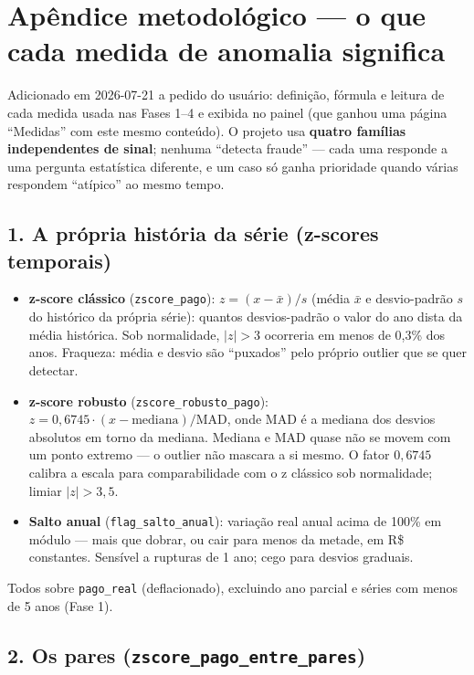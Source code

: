 \documentclass[11pt,a4paper]{article}
\begin{document}
\section{Apêndice metodológico --- o que cada medida de anomalia significa}

Adicionado em 2026-07-21 a pedido do usuário: definição, fórmula e leitura
de cada medida usada nas Fases 1--4 e exibida no painel (que ganhou uma
página ``Medidas'' com este mesmo conteúdo). O projeto usa \textbf{quatro
famílias independentes de sinal}; nenhuma ``detecta fraude'' --- cada uma
responde a uma pergunta estatística diferente, e um caso só ganha
prioridade quando várias respondem ``atípico'' ao mesmo tempo.

\subsection*{1. A própria história da série (z-scores temporais)}

\begin{itemize}
    \item \textbf{z-score clássico} (\texttt{zscore\_pago}):
    $z = (x - \bar{x})/s$ (média $\bar{x}$ e desvio-padrão $s$ do
    histórico da própria série): quantos desvios-padrão o valor do
    ano dista da média histórica. Sob normalidade, $|z| > 3$ ocorreria em
    menos de 0,3\% dos anos. Fraqueza: média e desvio são ``puxados''
    pelo próprio outlier que se quer detectar.
    \item \textbf{z-score robusto} (\texttt{zscore\_robusto\_pago}):
    $z = 0{,}6745\cdot(x - \mathrm{mediana})/\mathrm{MAD}$, onde MAD é a
    mediana dos desvios absolutos em torno da mediana. Mediana e MAD
    quase não se movem com um ponto extremo --- o outlier não mascara a
    si mesmo. O fator $0{,}6745$ calibra a escala para comparabilidade
    com o z clássico sob normalidade; limiar $|z| > 3{,}5$.
    \item \textbf{Salto anual} (\texttt{flag\_salto\_anual}): variação
    real anual acima de 100\% em módulo --- mais que dobrar, ou cair para
    menos da metade, em R\$ constantes. Sensível a rupturas de 1 ano;
    cego para desvios graduais.
\end{itemize}

Todos sobre \texttt{pago\_real} (deflacionado), excluindo ano parcial e
séries com menos de 5 anos (Fase 1).

\subsection*{2. Os pares (\texttt{zscore\_pago\_entre\_pares})}
\end{document}
